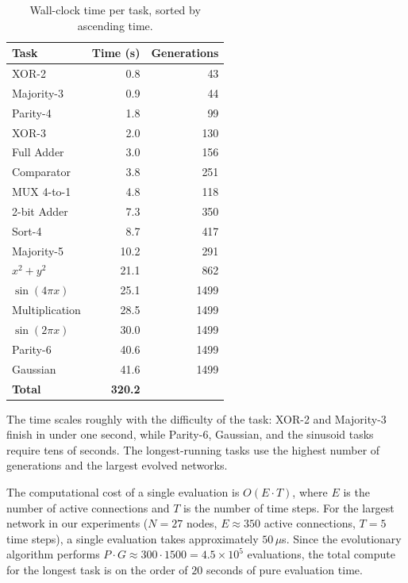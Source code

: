 \begin{table}[h]
  \centering
  \small
  \caption{Wall-clock time per task, sorted by ascending time.}
  \label{tab:time}
  \begin{tabular}{lrr}
    \toprule
    \textbf{Task} & \textbf{Time (s)} & \textbf{Generations} \\
    \midrule
    XOR-2         &  0.8 &   43 \\
    Majority-3    &  0.9 &   44 \\
    Parity-4      &  1.8 &   99 \\
    XOR-3         &  2.0 &  130 \\
    Full Adder    &  3.0 &  156 \\
    Comparator    &  3.8 &  251 \\
    MUX 4-to-1    &  4.8 &  118 \\
    2-bit Adder   &  7.3 &  350 \\
    Sort-4        &  8.7 &  417 \\
    Majority-5    & 10.2 &  291 \\
    $x^2 + y^2$   & 21.1 &  862 \\
    $\sin(4\pi x)$& 25.1 & 1499 \\
    Multiplication& 28.5 & 1499 \\
    $\sin(2\pi x)$& 30.0 & 1499 \\
    Parity-6      & 40.6 & 1499 \\
    Gaussian      & 41.6 & 1499 \\
    \midrule
    \textbf{Total} & \textbf{320.2} & \\
    \bottomrule
  \end{tabular}
\end{table}

The time scales roughly with the difficulty of the task: XOR-2 and
Majority-3 finish in under one second, while Parity-6, Gaussian, and
the sinusoid tasks require tens of seconds. The longest-running
tasks use the highest number of generations and the largest evolved
networks.

The computational cost of a single evaluation is $O(E \cdot T)$, where
$E$ is the number of active connections and $T$ is the number of time
steps. For the largest network in our experiments ($N = 27$ nodes,
$E \approx 350$ active connections, $T = 5$ time steps), a single
evaluation takes approximately $50\,\mu$s. Since the evolutionary
algorithm performs $P \cdot G \approx 300 \cdot 1500 = 4.5 \times
10^5$ evaluations, the total compute for the longest task is on the
order of $20$ seconds of pure evaluation time.

